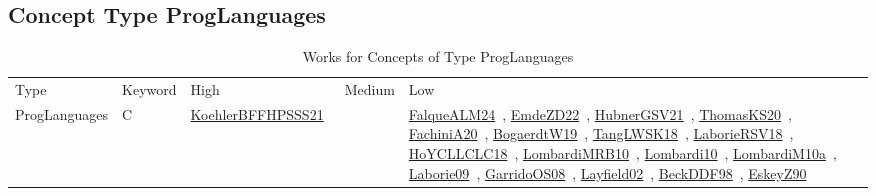 \clearpage
\subsection{Concept Type ProgLanguages}
\label{sec:ProgLanguages}
{\scriptsize
\begin{longtable}{lp{3cm}>{\raggedright\arraybackslash}p{6cm}>{\raggedright\arraybackslash}p{6cm}>{\raggedright\arraybackslash}p{8cm}}
\rowcolor{white}\caption{Works for Concepts of Type ProgLanguages}\\ \toprule
\rowcolor{white}Type & Keyword & High & Medium & Low\\ \midrule\endhead
\bottomrule
\endfoot
ProgLanguages & C  & \href{../works/KoehlerBFFHPSSS21.pdf}{KoehlerBFFHPSSS21}~\cite{KoehlerBFFHPSSS21} &  & \href{../works/FalqueALM24.pdf}{FalqueALM24}~\cite{FalqueALM24}, \href{../works/EmdeZD22.pdf}{EmdeZD22}~\cite{EmdeZD22}, \href{../works/HubnerGSV21.pdf}{HubnerGSV21}~\cite{HubnerGSV21}, \href{../works/ThomasKS20.pdf}{ThomasKS20}~\cite{ThomasKS20}, \href{../works/FachiniA20.pdf}{FachiniA20}~\cite{FachiniA20}, \href{../works/BogaerdtW19.pdf}{BogaerdtW19}~\cite{BogaerdtW19}, \href{../works/TangLWSK18.pdf}{TangLWSK18}~\cite{TangLWSK18}, \href{../works/LaborieRSV18.pdf}{LaborieRSV18}~\cite{LaborieRSV18}, \href{../works/HoYCLLCLC18.pdf}{HoYCLLCLC18}~\cite{HoYCLLCLC18}, \href{../works/LombardiMRB10.pdf}{LombardiMRB10}~\cite{LombardiMRB10}, \href{../works/Lombardi10.pdf}{Lombardi10}~\cite{Lombardi10}, \href{../works/LombardiM10a.pdf}{LombardiM10a}~\cite{LombardiM10a}, \href{../works/Laborie09.pdf}{Laborie09}~\cite{Laborie09}, \href{../works/GarridoOS08.pdf}{GarridoOS08}~\cite{GarridoOS08}, \href{../works/Layfield02.pdf}{Layfield02}~\cite{Layfield02}, \href{../works/BeckDDF98.pdf}{BeckDDF98}~\cite{BeckDDF98}, \href{../works/EskeyZ90.pdf}{EskeyZ90}~\cite{EskeyZ90}\\

\end{longtable}}

